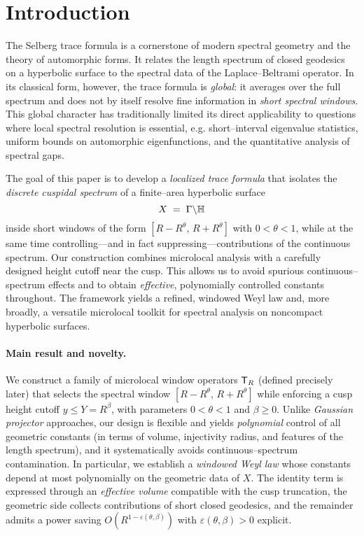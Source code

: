 \section{Introduction}\label{sec:intro}

The Selberg trace formula is a cornerstone of modern spectral geometry and the theory
of automorphic forms. It relates the length spectrum of closed geodesics on a hyperbolic
surface to the spectral data of the Laplace--Beltrami operator. In its classical form,
however, the trace formula is \emph{global}: it averages over the full spectrum and
does not by itself resolve fine information in \emph{short spectral windows}. This
global character has traditionally limited its direct applicability to questions where
local spectral resolution is essential, e.g. short--interval eigenvalue statistics,
uniform bounds on automorphic eigenfunctions, and the quantitative analysis of spectral
gaps.

The goal of this paper is to develop a \emph{localized trace formula} that isolates the
\emph{discrete cuspidal spectrum} of a finite--area hyperbolic surface
\[
  X \;=\; \Gamma\backslash\mathbb{H}
\]
inside short windows of the form $[R-R^\theta,\,R+R^\theta]$ with $0<\theta<1$, while at
the same time controlling---and in fact suppressing---contributions of the continuous
spectrum. Our construction combines microlocal analysis with a carefully designed height
cutoff near the cusp. This allows us to avoid spurious continuous--spectrum effects and
to obtain \emph{effective}, polynomially controlled constants throughout. The framework
yields a refined, windowed Weyl law and, more broadly, a versatile microlocal toolkit for
spectral analysis on noncompact hyperbolic surfaces.

\paragraph{Main result and novelty.}
We construct a family of microlocal window operators $\mathsf{T}_R$ (defined precisely later) that
selects the spectral window $[R-R^\theta,\,R+R^\theta]$ while enforcing a cusp height
cutoff $y\le Y=R^\beta$, with parameters $0<\theta<1$ and $\beta\ge 0$. Unlike
\emph{Gaussian projector} approaches, our design is flexible and yields \emph{polynomial}
control of all geometric constants (in terms of volume, injectivity radius, and features
of the length spectrum), and it systematically avoids continuous--spectrum contamination.
In particular, we establish a \emph{windowed Weyl law} whose constants depend at most
polynomially on the geometric data of $X$. The identity term is expressed through an
\emph{effective volume} compatible with the cusp truncation, the geometric side collects
contributions of short closed geodesics, and the remainder admits a power saving
$O(R^{1-\varepsilon(\theta,\beta)})$ with $\varepsilon(\theta,\beta)>0$ explicit.

